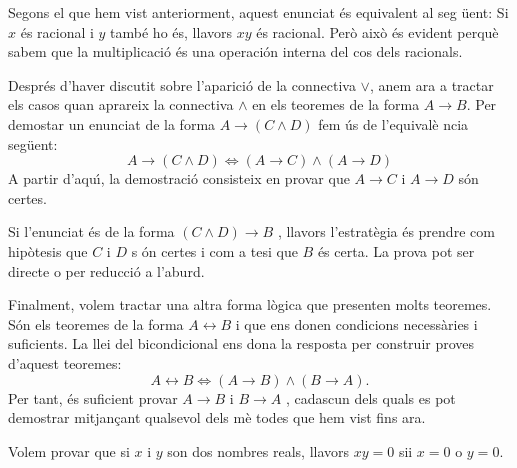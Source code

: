 \begin{solucio}
Segons el que hem vist anteriorment, aquest enunciat \'{e}s equivalent al seg%
\"{u}ent: Si $x$ \'{e}s racional i $y$ tamb\'{e} ho \'{e}s, llavors $xy$
\'{e}s racional. Per\`{o} aix\`{o} \'{e}s evident perqu\`{e} sabem que la
multiplicaci\'{o} \'{e}s una operaci\'{o}n interna del cos dels racionals.
\end{solucio}

\bigskip

Despr\'{e}s d'haver discutit sobre l'aparici\'{o} de la connectiva $\vee$,
anem ara a tractar els casos quan aprareix la connectiva $\wedge$ en els
teoremes de la forma $A\longrightarrow B$. Per demostar un enunciat de la
forma $A\longrightarrow\left( C\wedge D\right) $ fem \'{u}s de l'equival\`{e}%
ncia seg\"{u}ent:%
\begin{equation*}
A\longrightarrow\left( C\wedge D\right) \Longleftrightarrow\left(
A\longrightarrow C\right) \wedge\left( A\longrightarrow D\right)
\end{equation*}
A partir d'aqu\'{\i}, la demostraci\'{o} consisteix en provar que \thinspace$%
A\longrightarrow C$ i $A\longrightarrow D$ s\'{o}n certes.

Si l'enunciat \'{e}s de la forma $\left( C\wedge D\right) \longrightarrow B$%
, llavors l'estrat\`{e}gia \'{e}s prendre com hip\`{o}tesis que $C$ i $D$ s%
\'{o}n certes i com a tesi que $B$ \'{e}s certa. La prova pot ser directe o
per reducci\'{o} a l'aburd.

Finalment, volem tractar una altra forma l\`{o}gica que presenten molts
teoremes. S\'{o}n els teoremes de la forma $A\longleftrightarrow B$ i que
ens donen condicions necess\`{a}ries i suficients. La llei del bicondicional
ens dona la resposta per construir proves d'aquest teoremes:%
\begin{equation*}
A\longleftrightarrow B\Longleftrightarrow\left( A\longrightarrow B\right)
\wedge\left( B\longrightarrow A\right) \text{.}
\end{equation*}
Per tant, \'{e}s suficient provar $A\longrightarrow B$ i $B\longrightarrow A$%
, cadascun dels quals es pot demostrar mitjan\c{c}ant qualsevol dels m\`{e}%
todes que hem vist fins ara.

\begin{exemple}
Volem provar que si $x$ i $y$ son dos nombres reals, llavors $xy=0$ sii $x=0$
o $y=0$.
\end{exemple}

